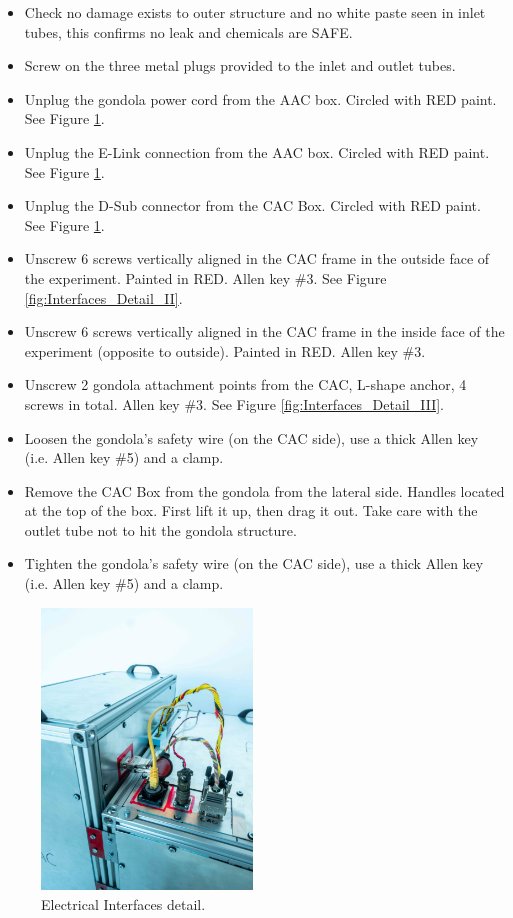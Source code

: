 \begin{itemize}
    \item Check no damage exists to outer structure and no white paste seen in inlet tubes, this confirms no leak and chemicals are SAFE.
    \item Screw on the three metal plugs provided to the inlet and outlet tubes.
    \item Unplug the gondola power cord from the AAC box. Circled with RED paint. See Figure \ref{fig:Interfaces_Detail_I}.
    \item Unplug the E-Link connection from the AAC box. Circled with RED paint. See Figure \ref{fig:Interfaces_Detail_I}.
    \item Unplug the D-Sub connector from the CAC Box. Circled with RED paint. See Figure \ref{fig:Interfaces_Detail_I}.
    \item Unscrew 6 screws vertically aligned in the CAC frame in the outside face of the experiment. Painted in RED. Allen key \#3. See Figure \ref{fig:Interfaces_Detail_II}.
    \item Unscrew 6 screws vertically aligned in the CAC frame in the inside face of the experiment (opposite to outside). Painted in RED. Allen key \#3.
    \item Unscrew 2 gondola attachment points from the CAC, L-shape anchor, 4 screws in total. Allen key \#3. See Figure \ref{fig:Interfaces_Detail_III}.
    \item Loosen the gondola's safety wire (on the CAC side), use a thick Allen key (i.e.  Allen key \#5) and a clamp.
    \item Remove the CAC Box from the gondola from the lateral side. Handles located at the top of the box. First lift it up, then drag it out. Take care with the outlet tube not to hit the gondola structure.
    \item Tighten the gondola's safety wire (on the CAC side), use a thick Allen key (i.e.  Allen key \#5) and a clamp.
\end{itemize}

\begin{figure}[H]
    \centering
    \includegraphics[width=0.5\textwidth]{appendix/img/Recovery_1.jpg}
    \caption{Electrical Interfaces detail.}
    \label{fig:Interfaces_Detail_I}
\end{figure}

